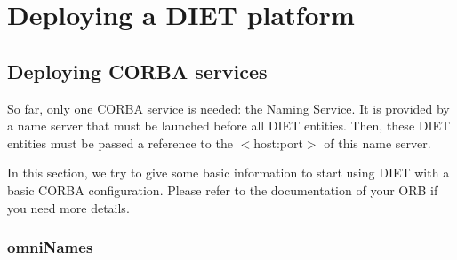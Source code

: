 
\chapter{Deploying a DIET platform}
\label{ch:deploying}


\section{Deploying CORBA services}
\label{sec:CORBA_services}

So far, only one CORBA service is needed: the Naming Service. It is provided by
a name server that must be launched before all DIET entities. Then, these DIET
entities must be passed a reference to the $<$host:port$>$ of this name server.

In this section, we try to give some basic information to start using DIET with
a basic CORBA configuration. Please refer to the documentation of your ORB if
you need more details.

\subsection{omniNames}

